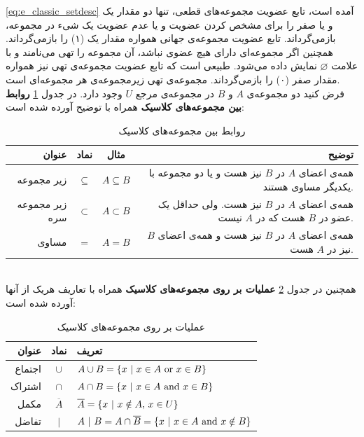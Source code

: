 \documentclass[12pt,a4paper]{article}
\theoremstyle{definition}
\begin{document}
 \ref{eq:e_classic_setdesc}
 آمده است، تابع عضویت مجموعه‌های قطعی، تنها دو مقدار یک و یا صفر را برای مشخص کردن عضویت و یا عدم عضویت یک شیء در مجموعه، بازمی‌گرداند. تابع عضویت مجموعه‌ی جهانی همواره مقدار یک (۱) را بازمی‌گرداند. همچنین اگر مجموعه‌ای دارای هیچ عضوی نباشد، آن مجموعه‌ را تهی
 می‌نامند و با علامت $\varnothing$ نمایش داده می‌شود. طبیعی است که  تابع عضویت مجموعه‌ی تهی نیز همواره مقدار صفر (۰) را بازمی‌گرداند. مجموعه‌ی تهی زیرمجموعه‌ی هر مجموعه‌ای است.
 \cite{Lee2005}
 \\
فرض کنید دو مجموعه‌ی $ A $ و $ B  $ در مجموعه‌ی مرجع $ U $ وجود دارد.  در جدول   
\ref{table:t_classic_rel}
\textbf{روابط بین مجموعه‌های کلاسیک} 
 همراه با توضیح آورده شده است:
\begin{table}[!htbp]
\begin{center}
	{\footnotesize
 \begin{tabular}{r c c r} \hline
عنوان & نماد &  مثال & توضیح  
\\\hline 
زیر مجموعه  &
$\subseteq$ &
$A \subseteq B$ &
همه‌ی اعضای $A$ در $B$ نیز هست و یا دو مجموعه با یکدیگر مساوی هستند.
\\
زیر مجموعه سره &
$\subset$ &
 $A \subset B$ &
همه‌ی اعضای $A$ در $B$ نیز هست. ولی حداقل یک عضو در $B$ هست که در $A$ نیست.
\\
مساوی &
$=$ &
$A = B$ &
همه‌ی اعضای $A$ در $B$ نیز هست و همه‌ی اعضای $B$ نیز در $A$ هست.
\\\hline
 \end{tabular}
 \caption{روابط بین مجموعه‌های کلاسیک}
 \label{table:t_classic_rel}
}
\end{center}
\end{table}\\
همچنین در جدول
\ref{table:t_classic_op}
\textbf{عملیات بر روی مجموعه‌های کلاسیک} 
همراه با تعاریف هریک از آنها آورده شده‌ است:
\begin{table}[!htbp]
	{\normalsize
	\begin{center}
		\begin{tabular}{r c l} \hline
			عنوان & نماد & تعریف  
			\\\hline 
			اجتماع   &
			$\cup$ &
			$A \cup B = \{x\ |\ x \in A\ {\rm or}\ x \in B \}$ 
			\\
			اشتراک   &
			$\cap$ &
			$A \cap B = \{x\ |\ x \in A\ {\rm and}\ x \in B \}$ 
			\\	
			مکمل &
			$\overline{A}$ &
			$\overline{A} = \{x\ |\ x \notin A{\rm ,}\ x \in U \}$ 
			\\
			تفاضل &
			$|$ &
			$A \ |\ B = A\cap \overline{B} = \{x\ |\ x \in A\ {\rm and}\ x \notin B \}$ 
		   \\\hline 
		\end{tabular}
		\caption{عملیات بر روی مجموعه‌های کلاسیک}
		\label{table:t_classic_op}
\end{center}
	}
\end{table} \\
\end{document}
